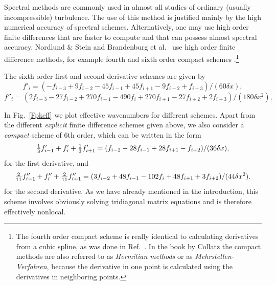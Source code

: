 \documentclass[\mydriver,12pt,twoside,notitlepage,a4paper]{article}
\begin{document}
Spectral methods are commonly used in almost all studies of ordinary
(usually incompressible) turbulence. The use of this method is justified
mainly by the high numerical accuracy of spectral schemes. Alternatively,
one may use high order finite differences that are faster to compute
and that can possess almost spectral accuracy.  Nordlund \& Stein \cite{NS90}
and Brandenburg et al.\ \cite{BNST95} use high order finite difference
methods, for example fourth and sixth order compact schemes
\cite{Lele92}.\footnote{The fourth order compact scheme is really identical to
calculating derivatives from a cubic spline, as was done in Ref.~\cite{NS90}.
In the book by Collatz \cite{Collatz66} the compact methods are also
referred to as {\it Hermitian methods} or as {\it Mehrstellen-Verfahren},
because the derivative in one point is calculated using the derivatives
in neighboring points.}

The sixth order first and second derivative schemes are given by
\begin{equation}
f'_i=(-f_{i-3}+9f_{i-2}-45f_{i-1}
+45f_{i+1}-9f_{i+2}+f_{i+3})/(60\delta x),
\end{equation}
\begin{equation}
f''_i=(2f_{i-3}-27f_{i-2}+270f_{i-1}-490f_i
+270f_{i+1}-27f_{i+2}+2f_{i+3})/(180\delta x^2),
\end{equation}

In Fig.~\ref{Fpkeff} we plot effective wavenumbers for different schemes.
Apart from the different {\it explicit} finite difference schemes
given above, we also consider a {\it compact} scheme of 6th order,
which can be written in the form
\begin{equation}
{\textstyle{1\over3}}f'_{i-1}+f'_i+{\textstyle{1\over3}}f'_{i+1}
=(f_{i-2}-28f_{i-1}+28f_{i+1}-f_{i+2})/(36\delta x),
\end{equation}
for the first derivative, and
\begin{equation}
{\textstyle{2\over11}}f''_{i-1}+f''_i+{\textstyle{2\over11}}f''_{i+1}
=(3f_{i-2}+48f_{i-1}-102f_i+48f_{i+1}+3f_{i+2})/(44\delta x^2).
\end{equation}
for the second derivative. As we have already mentioned in the introduction, this
scheme involves obviously solving tridiagonal matrix equations and is
therefore effectively nonlocal.
\end{document}

